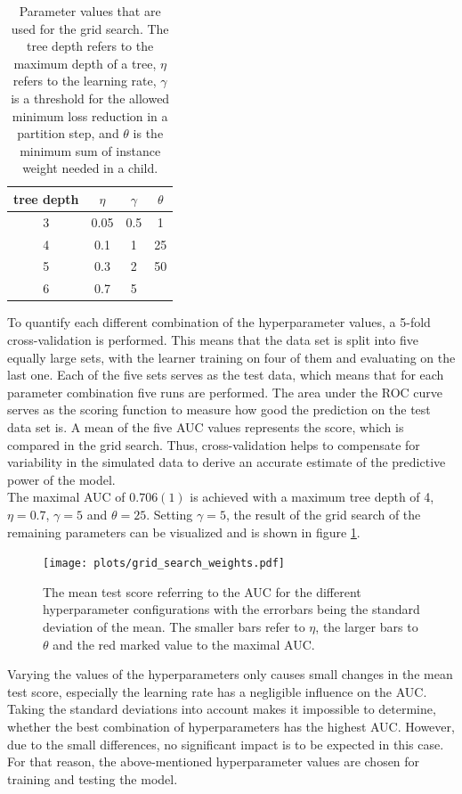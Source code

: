   \begin{table}
    \centering
    \begin{tabular}{c c c c}
      \toprule
      tree depth & $\eta$ & $\gamma$ & $\theta$ \\
      \midrule
      3 & 0.05 & 0.5 & 1  \\
      4 & 0.1  & 1   & 25  \\
      5 & 0.3  & 2 & 50  \\
      6 & 0.7  & 5   &  \\
    \end{tabular}
    \caption{Parameter values that are used for the grid search. The tree depth refers to the maximum depth of a tree, $\eta$ refers to the learning rate,
    $\gamma$ is a threshold for the allowed minimum loss reduction in a partition step, and $\theta$ is the minimum sum of instance weight needed in a child.}
    \label{tab:grid}
  \end{table}
To quantify each different combination of the hyperparameter values, a 5-fold cross-validation is performed. This means that the data set is split into five equally
large sets, with the learner training on four of them and evaluating on the last one. Each of the five sets serves as the test data, which means that for each
parameter combination five runs are performed. The area under the ROC curve serves as the scoring function to measure how good the prediction on the test data set is.
A mean of the five AUC values represents the score, which is compared in the grid search. Thus, cross-validation helps to compensate for variability in the simulated
data to derive an accurate estimate of the predictive power of the model. \\
The maximal AUC of $0.706(1)$ is achieved with a maximum tree depth of 4, $\eta=0.7$, $\gamma=5$ and $\theta=25$. Setting $\gamma=5$, the result of the grid search of the remaining
parameters can be visualized and is shown in figure \ref{fig:grid}.

\begin{figure}
  \centering
  \texttt{[image: plots/grid\_search\_weights.pdf]}
  \caption{The mean test score referring to the AUC for the different hyperparameter configurations with the errorbars being the standard deviation of the mean. The
  smaller bars refer to $\eta$, the larger bars to $\theta$ and the red marked value to the maximal AUC.}
  \label{fig:grid}
\end{figure}

Varying the values of the hyperparameters only causes small changes in the mean test score, especially the learning rate has a negligible influence on the AUC. Taking the
standard deviations into account makes it impossible to determine, whether the best combination of hyperparameters has the highest AUC. However, due to the
small differences, no significant impact is to be expected in this case. For that reason, the above-mentioned hyperparameter values are chosen for training and testing the model.

